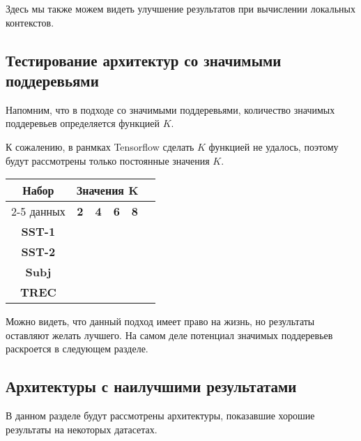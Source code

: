 Здесь мы также можем видеть улучшение результатов при вычислении локальных контекстов.

\subsection{Тестирование архитектур со значимыми поддеревьями}

Напомним, что в подходе со значимыми поддеревьями, количество значимых поддеревьев определяется функцией $K$.

К сожалению, в ранмках Tensorflow сделать $K$ функцией не удалось, поэтому будут рассмотрены только постоянные значения $K$.

\vspace{5mm}
\noindent \begin{minipage}{\linewidth}
 \label{tab:title} 
\begin{tabular}{|c|c|c|c|c|c|}
\hline
\multirow{2}{*}{Набор}   &  \multicolumn{4}{c|}{Значения K} \\ \cline{2-5} 
     данных              &  \textbf{2}  & \textbf{4}   & \textbf{6} & \textbf{8} \\ \hline
\textbf{SST-1}           &              &              &            &            \\ \hline
\textbf{SST-2}           &              &              &            &            \\ \hline
\textbf{Subj}            &              &              &            &            \\ \hline
\textbf{TREC}            &              &              &            &            \\ \hline
\end{tabular}
\end{minipage}
\vspace{5mm}


Можно видеть, что данный подход имеет право на жизнь, но результаты оставляют желать лучшего.
На самом деле потенциал значимых поддеревьев раскроется в следующем разделе.

\subsection{Архитектуры с наилучшими результатами}

В данном разделе будут рассмотрены архитектуры, показавшие хорошие результаты на некоторых датасетах.

